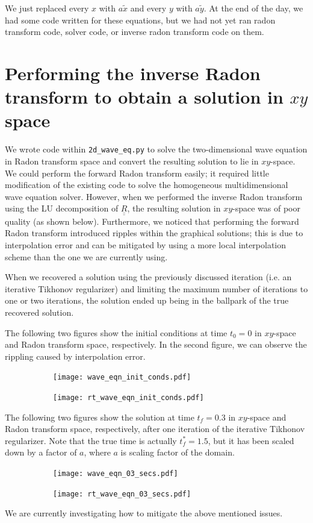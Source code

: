 \documentclass[12pt]{article}
\newcommand{\bunderline}[1]{\underline{#1}}
\newcommand{\mat}[1]{{\bunderline{\bunderline{#1}}}}
\begin{document}
We just replaced every $x$ with $a\tilde{x}$ and every $y$ with $a\tilde{y}$. At the end of the day, we had some code written for these equations, but we had not yet ran radon transform code, solver code, or inverse radon transform code on them. 

\section*{Performing the inverse Radon transform to obtain a solution in $xy$ space}
We wrote code within \verb|2d_wave_eq.py| to solve the two-dimensional wave equation in Radon transform space and convert the resulting solution to lie in $xy$-space.
We could perform the forward Radon transform easily; it required little modification of the existing code to solve the homogeneous multidimensional wave equation solver.
However, when we performed the inverse Radon transform using the LU decomposition of $\mat{R}$, the resulting solution in $xy$-space was of poor quality (as shown below).
Furthermore, we noticed that performing the forward Radon transform introduced ripples within the graphical solutions; this is due to interpolation error and can be mitigated by using a more local interpolation scheme than the one we are currently using.
\par
When we recovered a solution using the previously discussed iteration (i.e. an iterative Tikhonov regularizer) and limiting the maximum number of iterations to one or two iterations, the solution ended up being in the ballpark of the true recovered solution.
\par
The following two figures show the initial conditions at time $t_{0} = 0$ in $xy$-space and Radon transform space, respectively.
In the second figure, we can observe the rippling caused by interpolation error. 
\begin{figure}[H]
	\centering
	\begin{subfigure}[h]{0.475\textwidth}
		\texttt{[image: wave\_eqn\_init\_conds.pdf]}
	\end{subfigure}
	\begin{subfigure}[h]{0.475\textwidth}
		\texttt{[image: rt\_wave\_eqn\_init\_conds.pdf]}
	\end{subfigure}
\end{figure}
The following two figures show the solution at time $t_{f} = 0.3$ in $xy$-space and Radon transform space, respectively, after one iteration of the iterative Tikhonov regularizer.
Note that the true time is actually $t_{f}^{*} = 1.5$, but it has been scaled down by a factor of $a$, where $a$ is scaling factor of the domain.
\begin{figure}[H]
	\centering
	\begin{subfigure}[h]{0.475\textwidth}
		\texttt{[image: wave\_eqn\_03\_secs.pdf]}
	\end{subfigure}
	\begin{subfigure}[h]{0.475\textwidth}
		\texttt{[image: rt\_wave\_eqn\_03\_secs.pdf]}
	\end{subfigure}
\end{figure}
We are currently investigating how to mitigate the above mentioned issues.
\end{document}
